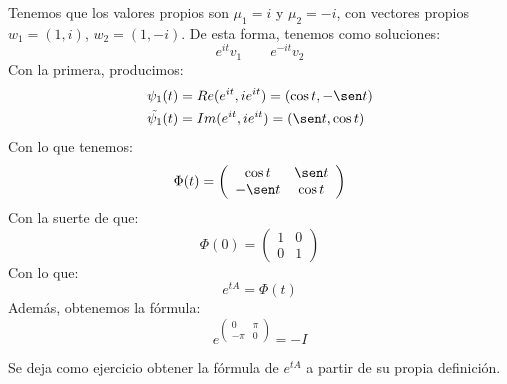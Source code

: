 \begin{enumerate}
\begin{ejemplo}
            Tenemos que los valores propios son $\mu_1=i$ y $\mu_2= -i$, con vectores propios $w_1=(1,i)$, $w_2=(1,-i)$. De esta forma, tenemos como soluciones:
            \begin{equation*}
                e^{it}v_1 \qquad e^{-it}v_2
            \end{equation*}
            Con la primera, producimos:
            \begin{align*}
                \psi_1(t) &= Re(e^{it}, ie^{it}) = (\cos t, -\sen t) \\
                \tilde{\psi_1}(t) &=  Im(e^{it}, ie^{it}) = (\sen t, \cos t)
            \end{align*}
            Con lo que tenemos:
            \begin{equation*}
                \Phi(t) = \left(\begin{array}{cc}
                        \cos t & \sen t \\
                        -\sen t & \cos t
                \end{array}\right)
            \end{equation*}
            Con la suerte de que:
            \begin{equation*}
                \Phi(0) = \left(\begin{array}{cc}
                        1 & 0 \\
                        0 & 1
                \end{array}\right)
            \end{equation*}
            Con lo que:
            \begin{equation*}
                e^{tA} = \Phi(t)
            \end{equation*}
            Además, obtenemos la fórmula:
            \begin{equation*}
                e^{\begin{pmatrix}
                0 & \pi \\
                -\pi & 0
                \end{pmatrix}} = -I
            \end{equation*}
        \end{ejemplo}
        \begin{ejercicio*}
            Se deja como ejercicio obtener la fórmula de $e^{tA}$ a partir de su propia definición.
        \end{ejercicio*}


\end{enumerate}
